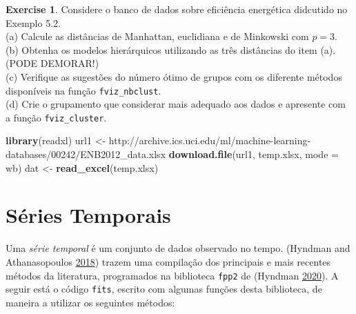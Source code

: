 \documentclass[
]{book}
\newenvironment{Shaded}{\begin{snugshade}}{\end{snugshade}}
\newcommand{\DataTypeTok}[1]{\textcolor[rgb]{0.13,0.29,0.53}{#1}}
\newcommand{\KeywordTok}[1]{\textcolor[rgb]{0.13,0.29,0.53}{\textbf{#1}}}
\newcommand{\NormalTok}[1]{#1}
\newcommand{\StringTok}[1]{\textcolor[rgb]{0.31,0.60,0.02}{#1}}
\theoremstyle{definition}
\theoremstyle{definition}
\theoremstyle{definition}
\newtheorem{exercise}{Exercise}[chapter]
\theoremstyle{remark}
\begin{document}
\begin{exercise}
\protect\hypertarget{exr:unnamed-chunk-177}{}{\label{exr:unnamed-chunk-177} }Considere o banco de dados sobre eficiência energética didcutido no Exemplo 5.2.\\
(a) Calcule as distâncias de Manhattan, euclidiana e de Minkowski com \(p=3\).\\
(b) Obtenha os modelos hierárquicos utilizando as três distâncias do item (a). (PODE DEMORAR!)\\
(c) Verifique as sugestões do número ótimo de grupos com os diferente métodos disponíveis na função \texttt{fviz\_nbclust}.\\
(d) Crie o grupamento que considerar mais adequado aos dados e apresente com a função \texttt{fviz\_cluster}.\\
\end{exercise}

\begin{Shaded}
\begin{Highlighting}[]
\KeywordTok{library}\NormalTok{(readxl)}
\NormalTok{url1 \textless{}{-}}\StringTok{ \textquotesingle{}http://archive.ics.uci.edu/ml/machine{-}learning{-}databases/00242/ENB2012\_data.xlsx\textquotesingle{}}
\KeywordTok{download.file}\NormalTok{(url1, }\StringTok{\textquotesingle{}temp.xlsx\textquotesingle{}}\NormalTok{, }\DataTypeTok{mode =} \StringTok{\textquotesingle{}wb\textquotesingle{}}\NormalTok{)}
\NormalTok{dat \textless{}{-}}\StringTok{ }\KeywordTok{read\_excel}\NormalTok{(}\StringTok{\textquotesingle{}temp.xlsx\textquotesingle{}}\NormalTok{)}
\end{Highlighting}
\end{Shaded}

\hypertarget{seriestemporais}{%
\chapter{Séries Temporais}\label{seriestemporais}}

Uma \emph{série temporal} é um conjunto de dados observado no tempo. (Hyndman and Athanasopoulos \protect\hyperlink{ref-hyndman2018forecasting}{2018}) trazem uma compilação dos principais e mais recentes métodos da literatura, programados na biblioteca \texttt{fpp2} de (Hyndman \protect\hyperlink{ref-hyndman2020fpp2}{2020}). A seguir está o código \texttt{fits}, escrito com algumas funções desta biblioteca, de maneira a utilizar os seguintes métodos:
\end{document}
